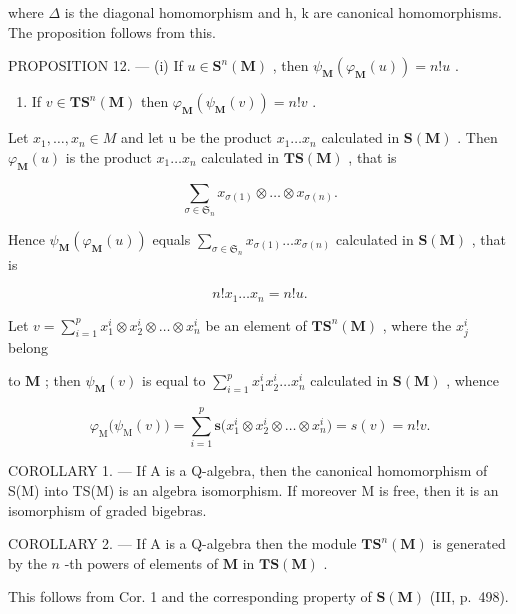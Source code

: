 where \(\Delta\) is the diagonal homomorphism and h, k are canonical homomorphisms. The proposition follows from this.

PROPOSITION 12. --- (i) If \(u \in \mathbf{S}^n(\mathbf{M})\) , then \(\psi_{\mathbf{M}}(\varphi_{\mathbf{M}}(u)) = n!u\) .

\begin{enumerate}
\def\labelenumi{(\roman{enumi})}
\setcounter{enumi}{1}
\tightlist
\item
  If \(v \in \mathbf{T}\mathbf{S}^n(\mathbf{M})\) then \(\varphi_{\mathbf{M}}(\psi_{\mathbf{M}}(v)) = n!v\) .
\end{enumerate}

Let \(x_{1}, \ldots, x_{n} \in M\) and let u be the product \(x_{1} \ldots x_{n}\) calculated in \(\mathbf{S}(\mathbf{M})\) . Then \(\varphi_{\mathbf{M}}(u)\) is the product \(x_{1} \ldots x_{n}\) calculated in \(\mathbf{T}\mathbf{S}(\mathbf{M})\) , that is

\[
\sum_ {\sigma \in \mathfrak {S} _ {n}} x _ {\sigma (1)} \otimes \dots \otimes x _ {\sigma (n)}.
\]

Hence \(\psi_{\mathbf{M}}(\varphi_{\mathbf{M}}(u))\) equals \(\sum_{\sigma \in \mathfrak{S}_n}x_{\sigma (1)}\ldots x_{\sigma (n)}\) calculated in \(\mathbf{S}(\mathbf{M})\) , that is

\[
n! x _ {1} \dots x _ {n} = n! u.
\]

Let \(v = \sum_{i=1}^{p} x_1^i \otimes x_2^i \otimes \ldots \otimes x_n^i\) be an element of \(\mathbf{TS}^n(\mathbf{M})\) , where the \(x_j^i\) belong

to \(\mathbf{M}\) ; then \(\psi_{\mathbf{M}}(v)\) is equal to \(\sum_{i=1}^{p} x_1^i x_2^i \ldots x_n^i\) calculated in \(\mathbf{S}(\mathbf{M})\) , whence

\[
\varphi_ {\mathrm{M}} \big (\psi_ {\mathrm{M}} (v) \big) = \sum_ {i = 1} ^ {p} \mathbf {s} \big (x _ {1} ^ {i} \otimes x _ {2} ^ {i} \otimes \dots \otimes x _ {n} ^ {i} \big) = s (v) = n! v.
\]

COROLLARY 1. --- If A is a Q-algebra, then the canonical homomorphism of S(M) into TS(M) is an algebra isomorphism. If moreover M is free, then it is an isomorphism of graded bigebras.

COROLLARY 2. --- If A is a Q-algebra then the module \(\mathbf{TS}^n (\mathbf{M})\) is generated by the \(n\) -th powers of elements of \(\mathbf{M}\) in \(\mathbf{TS}(\mathbf{M})\) .

This follows from Cor. 1 and the corresponding property of \(\mathbf{S}(\mathbf{M})\) (III, p.~498).

